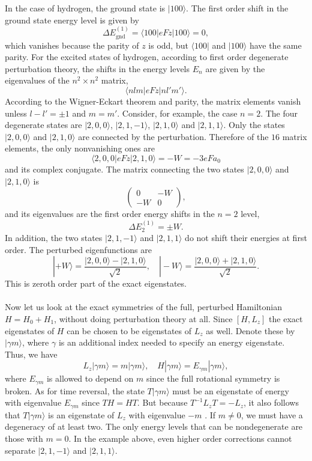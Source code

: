 \\ \\
In the case of hydrogen, the ground state is $|100\rangle$. The first order shift in the ground state energy level is given by
\[\Delta E^{(1)}_{\mathrm{gnd}} = \langle 100 | eFz | 100\rangle = 0,\]
which vanishes because the parity of $z$ is odd, but $\langle 100 |$ and $| 100\rangle$ have the same parity.
For the excited states of hydrogen, according to first order degenerate perturbation theory, the shifts in the energy levels $E_n$ are given by the eigenvalues of the $n^2\times n^2$ matrix,
\[\langle nlm | eFz | nl'm'\rangle.\]
According to the Wigner-Eckart theorem and parity, the matrix elements vanish unless $l -l' = \pm 1$ and $m = m'$. Consider, for example, the case $n=2$. The four degenerate states are  $|2,0,0\rangle$, $|2,1,-1\rangle$, $|2,1,0\rangle$ and $|2,1,1\rangle$. Only the states $|2,0,0\rangle$ and $|2,1,0\rangle$ are connected by the perturbation. Therefore of the $16$ matrix elements, the only nonvanishing ones are
\[\langle 2,0,0 | eFz | 2,1,0\rangle = -W = -3eFa_0\]
and its complex conjugate. 
The matrix connecting the two states $|2,0,0\rangle$ and $|2,1,0\rangle$ is
\[\begin{pmatrix}0 & -W \\ -W & 0\end{pmatrix} ,\]
and its eigenvalues are the first order energy shifts in the $n=2$ level,
\[\Delta E_2^{(1)} = \pm W.\]
In addition, the two states $|2,1,-1\rangle$ and $|2,1,1\rangle$ do not shift their energies at first order. The perturbed eigenfunctions are
\[|+W\rangle = \frac{|2,0,0\rangle - |2,1,0\rangle}{\sqrt{2}} , \quad |-W\rangle = \frac{|2,0,0\rangle + |2,1,0\rangle}{\sqrt{2}}.\]
This is zeroth order part of the exact eigenstates.
\\ \\
Now let us look at the exact symmetries of the full, perturbed Hamiltonian $ H = H_0 + H_1$, without doing perturbation theory at all. Since $[H,L_z]$ the exact eigenstates of $H$ can be chosen to be eigenstates of $L_z$ as well.
Denote these by $|\gamma m \rangle$, where $\gamma$ is an additional index needed to specify an energy
eigenstate. Thus, we have
\[L_z |\gamma m \rangle = m |\gamma m \rangle , \quad H |\gamma m \rangle = E_{\gamma m} |\gamma m \rangle,\]
where $E_{\gamma m}$ is allowed to depend on $m$ since the full rotational symmetry is broken.
As for time reversal, the state $T|\gamma m\rangle$ must be an eigenstate of energy with eigenvalue $E_{\gamma m}$ since $TH = HT$. But because $T^{-1}L_zT = -L_z$, it also follows that $T|\gamma m\rangle$ is an eigenstate of $L_z$ with eigenvalue $-m$ . If $m \neq 0$, we must have a degeneracy of at least two. 
The only energy levels that can be nondegenerate are those with $m=0$. In the example above, even higher order corrections cannot separate $|2,1,-1\rangle$ and $|2,1,1\rangle$.


